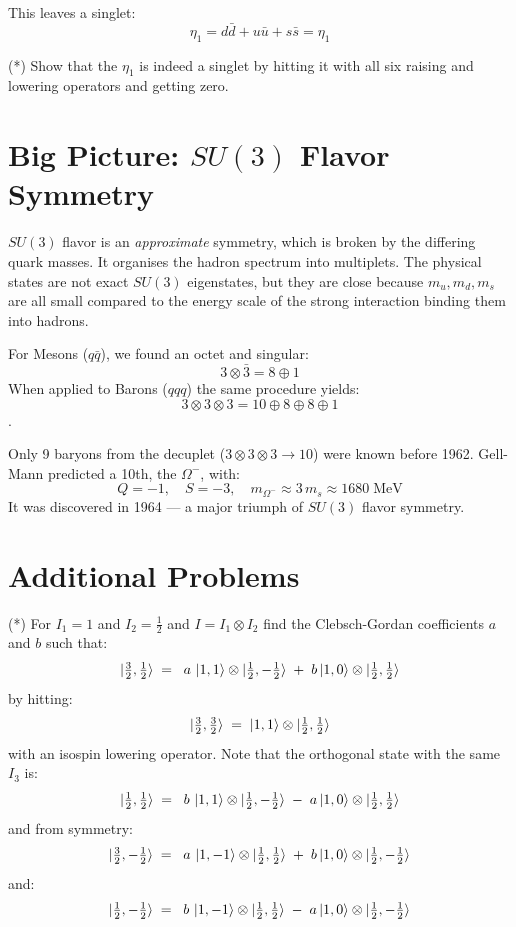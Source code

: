 \documentclass[12pt]{article}
\begin{document}
This leaves a singlet:
$$\eta_1 = d\bar{d} + u\bar{u} + s \bar{s}= \eta_1$$

\exercise (*) Show that the $\eta_1$ is indeed a singlet by hitting it
with all six raising and lowering operators and getting zero.\\[5pt]

\section*{Big Picture: $SU(3)$ Flavor Symmetry}

$SU(3)$ flavor is an \emph{approximate} symmetry, which is broken by
the differing quark masses. It organises the hadron spectrum into
multiplets. The physical states are not exact $SU(3)$ eigenstates, but
they are close because $m_u, m_d, m_s$ are all small compared to the
energy scale of the strong interaction binding them into hadrons.

For Mesons ($q\bar{q}$), we found an octet and singular:
$$3\otimes\bar{3} = 8 \oplus 1$$
When applied to Barons ($qqq$) the same procedure yields:
$$3\otimes3\otimes3 = 10\oplus 8\oplus 8\oplus 1$$.

Only 9 baryons from the decuplet ($3\otimes3\otimes3\to10$) were known
before 1962. Gell-Mann predicted a 10th, the $\Omega^-$, with:
\begin{equation*}
  Q = -1,\quad S = -3,\quad m_{\Omega^-} \approx 3\,m_s \approx 1680\;\text{MeV}
\end{equation*}
It was discovered in 1964 --- a major triumph of $SU(3)$ flavor symmetry.


\section{Additional Problems}

\exercise (*)  For $I_1=1$ and $I_2=\tfrac{1}{2}$ and $I=I_1 \otimes I_2$
find the Clebsch-Gordan coefficients $a$ and $b$ such that:
$$\ket{\tfrac{3}{2},\tfrac{1}{2}} \; = \;
\; a \, \ket{1,1} \otimes \ket{\tfrac{1}{2},-\tfrac{1}{2}}
\; + \; b \ket{1,0} \otimes \ket{\tfrac{1}{2},\tfrac{1}{2}}$$ 
by hitting:
$$\ket{\tfrac{3}{2},\tfrac{3}{2}} \; = \;
\ket{1,1} \otimes \ket{\tfrac{1}{2},\tfrac{1}{2}}$$
with an isospin lowering operator.  Note that the orthogonal state with the same $I_3$ is:
$$\ket{\tfrac{1}{2},\tfrac{1}{2}} \; = \;
\; b \, \ket{1,1} \otimes \ket{\tfrac{1}{2},-\tfrac{1}{2}}
\; - \; a \ket{1,0} \otimes \ket{\tfrac{1}{2},\tfrac{1}{2}}$$ 
and from symmetry:
$$\ket{\tfrac{3}{2},-\tfrac{1}{2}} \; = \;
\; a \, \ket{1,-1} \otimes \ket{\tfrac{1}{2},\tfrac{1}{2}}
\; + \; b \ket{1,0} \otimes \ket{\tfrac{1}{2},-\tfrac{1}{2}}$$ 
and:
$$\ket{\tfrac{1}{2},-\tfrac{1}{2}} \; = \;
\; b \, \ket{1,-1} \otimes \ket{\tfrac{1}{2},\tfrac{1}{2}}
\; - \; a \ket{1,0} \otimes \ket{\tfrac{1}{2},-\tfrac{1}{2}}$$ 
\\[5pt]
\end{document}
